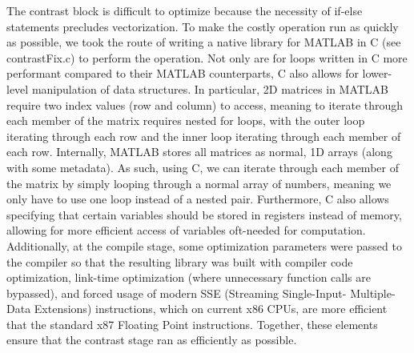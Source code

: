 The contrast block is difficult to optimize because the necessity of if-else statements precludes 
vectorization. To make the costly operation run as quickly as possible, we took the route of 
writing a native library for MATLAB in C (see contrastFix.c) to perform the operation. Not only 
are for loops written in C more performant compared to their MATLAB counterparts, C also allows 
for lower-level manipulation of data structures. In particular, 2D matrices in MATLAB require 
two index values (row and column) to access, meaning to iterate through each member of the matrix 
requires nested for loops, with the outer loop iterating through each row and the inner loop 
iterating through each member of each row. Internally, MATLAB stores all matrices as normal, 1D 
arrays (along with some metadata). As such, using C, we can iterate through each member of the matrix 
by simply looping through a normal array of numbers, meaning we only have to use one loop instead 
of a nested pair. Furthermore, C also allows specifying that certain variables should be stored in 
registers instead of memory, allowing for more efficient access of variables oft-needed for computation. 
Additionally, at the compile stage, some optimization parameters were passed to the compiler so that 
the resulting library was built with compiler code optimization, link-time optimization (where 
unnecessary function calls are bypassed), and forced usage of modern SSE (Streaming Single-Input-
Multiple-Data Extensions) instructions, which on current x86 CPUs, are more efficient that the 
standard x87 Floating Point instructions. Together, these elements ensure that the contrast stage 
ran as efficiently as possible.